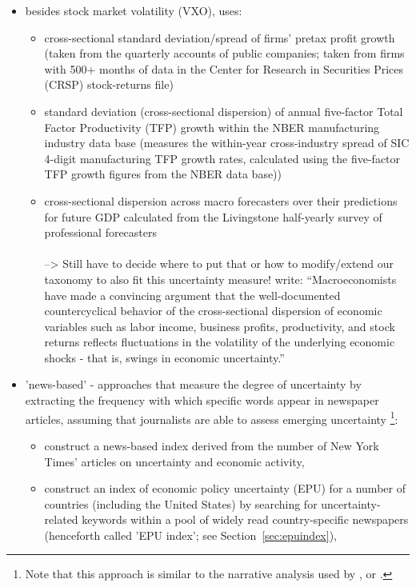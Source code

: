 \documentclass[a4paper,11pt,listof=nochaptergap,oneside,pointednumbers,bibtotoc,bigheadings,liststotoc]{scrbook}
\begin{document}
\begin{itemize}
\begin{itemize}
\begin{itemize}
			\end{itemize}
			\item besides stock market volatility (VXO), \citet{bloom:09} uses: 
			\begin{itemize}
				\item cross-sectional standard deviation/spread of firms' pretax profit growth (taken from the quarterly accounts of public companies; taken from firms with 500+ months of data in the Center for Research in Securities Prices (CRSP) stock-returns file)
				\item standard deviation (cross-sectional dispersion) of annual five-factor Total Factor Productivity (TFP) growth within the NBER manufacturing industry data base (measures the within-year cross-industry spread of SIC 4-digit manufacturing TFP growth rates, calculated using the five-factor TFP growth figures from the NBER data base))
				\item cross-sectional dispersion across macro forecasters over their predictions for future GDP calculated from the Livingstone half-yearly survey of professional forecasters
				\\
				\\--> Still have to decide where to put that or how to modify/extend our taxonomy to also fit this uncertainty measure! \citet[p. 1]{gilchristetal:14} write: ``Macroeconomists have made a convincing argument that the well-documented countercyclical behavior of the cross-sectional dispersion of economic variables such as labor income, business profits, productivity, and stock returns reflects fluctuations in the volatility of the underlying economic shocks - that is, swings in economic uncertainty.''
			\end{itemize}
			\item 'news-based' - approaches that measure the degree of uncertainty by extracting the frequency with which specific words appear in newspaper articles, assuming that journalists are able to assess emerging uncertainty \footnote{Note that this approach is similar to the narrative analysis used by \citet{romerandromer:04}, \citet{romandrom:17} or \citet{ramey:09}.}: 
			\begin{itemize}
				\item \citet{alexopoulosandcohen:09} construct a news-based index derived from the number of New York Times' articles on uncertainty and economic activity,
				\item \citet{bakeretal:15} construct an index of economic policy uncertainty (EPU) for a number of countries (including the United States) by searching for uncertainty-related keywords within a pool of widely read country-specific newspapers (henceforth called 'EPU index'; see Section~\ref{sec:epuindex}),\\

\end{itemize}
\end{itemize}
\end{itemize}
\end{document}
